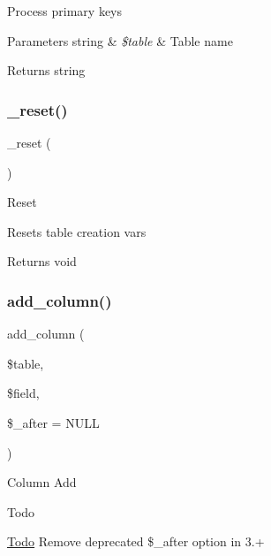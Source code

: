 Process primary keys


\begin{DoxyParams}[1]{Parameters}
string & {\em \$table} & Table name \\
\hline
\end{DoxyParams}
\begin{DoxyReturn}{Returns}
string 
\end{DoxyReturn}
\mbox{\label{class_c_i___d_b__forge_ab90fa1f6f390913fed8670e6535dc180}} 
\subsubsection{\texorpdfstring{\+\_\+reset()}{\_reset()}}
{\footnotesize\ttfamily \+\_\+reset (\begin{DoxyParamCaption}{ }\end{DoxyParamCaption})\hspace{0.3cm}{\ttfamily [protected]}}

Reset

Resets table creation vars

\begin{DoxyReturn}{Returns}
void 
\end{DoxyReturn}
\mbox{\label{class_c_i___d_b__forge_a855261dcf98c0cf401aa469994919c51}} 
\subsubsection{\texorpdfstring{add\+\_\+column()}{add\_column()}}
{\footnotesize\ttfamily add\+\_\+column (\begin{DoxyParamCaption}\item[{}]{\$table,  }\item[{}]{\$field,  }\item[{}]{\$\+\_\+after = {\ttfamily NULL} }\end{DoxyParamCaption})}

Column Add

\begin{DoxyRefDesc}{Todo}
\item[\mbox{\hyperlink{todo__todo000003}{Todo}}]Remove deprecated \$\+\_\+after option in 3.+ \end{DoxyRefDesc}


